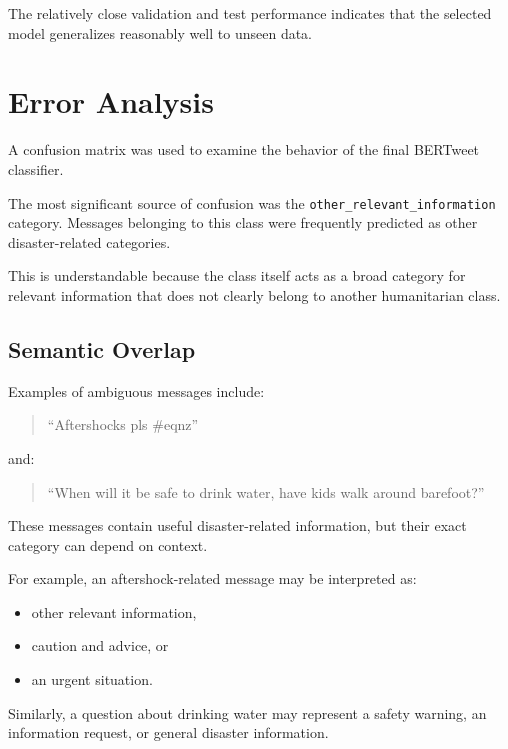 \documentclass[12pt,a4paper]{article}
\begin{document}
The relatively close validation and test performance indicates that the
selected model generalizes reasonably well to unseen data.

\section{Error Analysis}

A confusion matrix was used to examine the behavior of the final BERTweet
classifier.

The most significant source of confusion was the
\texttt{other\_relevant\_information} category. Messages belonging to this
class were frequently predicted as other disaster-related categories.

This is understandable because the class itself acts as a broad category for
relevant information that does not clearly belong to another humanitarian
class.

\subsection{Semantic Overlap}

Examples of ambiguous messages include:

\begin{quote}
``Aftershocks pls \#eqnz''
\end{quote}

and:

\begin{quote}
``When will it be safe to drink water, have kids walk around barefoot?''
\end{quote}

These messages contain useful disaster-related information, but their exact
category can depend on context.

For example, an aftershock-related message may be interpreted as:

\begin{itemize}
    \item other relevant information,
    \item caution and advice, or
    \item an urgent situation.
\end{itemize}

Similarly, a question about drinking water may represent a safety warning,
an information request, or general disaster information.
\end{document}

